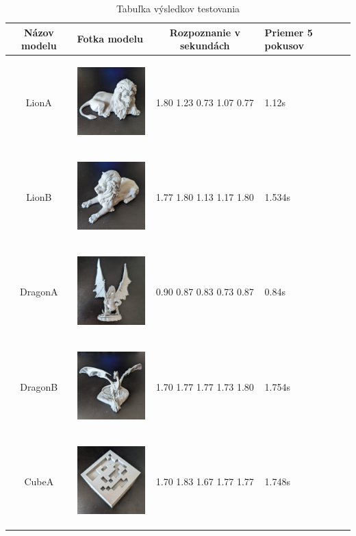 \begin{table}[h!]
\centering
\caption{Tabuľka výsledkov testovania}
\small 
\setlength{\tabcolsep}{3pt} 
\begin{tabular}{|c|>{\centering\arraybackslash}m{3.5cm}|c|>{\centering\arraybackslash}m{3cm}|c|}
\hline
Názov modelu & Fotka modelu & Rozpoznanie v sekundách & Priemer 5 pokusov \\
\hline
LionA & \includegraphics[width=3.4cm,height=3.4cm,keepaspectratio]{img/LionA.jpg} & 1.80 1.23 0.73 1.07 0.77 & 1.12s \\
LionB & \includegraphics[width=3.4cm,height=3.4cm,keepaspectratio]{img/LionB.jpg} & 1.77 1.80 1.13 1.17 1.80 & 1.534s \\
DragonA & \includegraphics[width=3.4cm,height=3.4cm,keepaspectratio]{img/DragonA.jpg} & 0.90 0.87 0.83 0.73 0.87 & 0.84s \\
DragonB & \includegraphics[width=3.4cm,height=3.4cm,keepaspectratio]{img/DragonB.jpg} & 1.70 1.77 1.77 1.73 1.80 & 1.754s \\
CubeA & \includegraphics[width=3.4cm,height=3.4cm,keepaspectratio]{img/CubeA.jpg} & 1.70 1.83 1.67 1.77 1.77 & 1.748s \\

\end{tabular}
\end{table}
